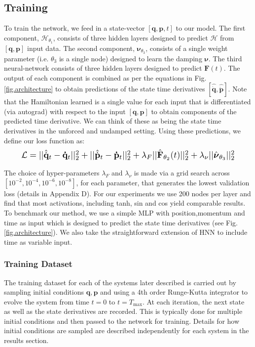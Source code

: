 \documentclass{article}
\begin{document}
\subsection*{Training}
To train the network, we feed in a state-vector $ [\mathbf{q},\mathbf{p},t]$ to our model. The first component, $\mathcal{H}_{\theta_1}$, consists of three hidden layers designed to predict $\mathcal{H}$ from $[\mathbf{q},\mathbf{p}]$ input data. The second component, $\boldsymbol\nu_{\theta_3}$, consists of a single weight parameter (i.e. $\theta_3$ is a single node) designed to learn the damping $\boldsymbol\nu$. The third neural-network consists of three hidden layers designed to predict $\mathbf{F}(t)$. The output of each component is combined as per the equations in Fig.\ref{fig.architecture} to obtain predictions of the state time derivatives $[\hat{\dot{\mathbf{q}}},\hat{\dot{\mathbf{p}}}]$. Note that the Hamiltonian learned is a single value for each input that is differentiated (via autograd) with respect to the input $[\mathbf{q},\mathbf{p}]$ to obtain components of the predicted time derivative. We can think of these as being the state time derivatives in the unforced and undamped setting. Using these predictions, we define our loss function as:
\begin{equation}
\label{eqn.loss}
\resizebox{0.9\columnwidth}{!}{%
  $\mathcal{L} =|| \hat{\dot{\mathbf{q}}}_t - \mathbf{\dot{q}}_t ||_2^2 +
|| \hat{\dot{\mathbf{p}}}_t -\mathbf{\dot{p}}_t ||_2^2 + \lambda_F|| \hat{\mathbf{F}}_{\theta_2} (t)||_2^2 + \lambda_\nu||\hat{\boldsymbol\nu}_{\theta_3}||_2^2$%
}
\end{equation}

The choice of hyper-parameters $\lambda_F$ and $\lambda_{\nu}$ is made via a grid search across $[10^{-2},10^{-4},10^{-6},10^{-8}]$, for each parameter, that generates the lowest validation loss (details in Appendix D). For our experiments we use 200 nodes per layer and find that most activations, including tanh, sin and cos yield comparable results. To benchmark our method, we use a simple MLP with position,momentum and time as input which is designed to predict the state time derivatives (see Fig.\ref{fig.architecture}). We also take the straightforward extension of HNN to include time as variable input. 
\subsubsection*{Training Dataset}

The training dataset for each of the systems later described is carried out by sampling initial conditions $\mathbf{q},\mathbf{p}$ and using a 4th order Runge-Kutta integrator to evolve the system from time $t=0$ to $t=T_{\max}$. At each iteration, the next state as well as the state derivatives are recorded. This is typically done for multiple initial conditions and then passed to the network for training. Details for how initial conditions are sampled are described independently for each system in the results section.
\end{document}
